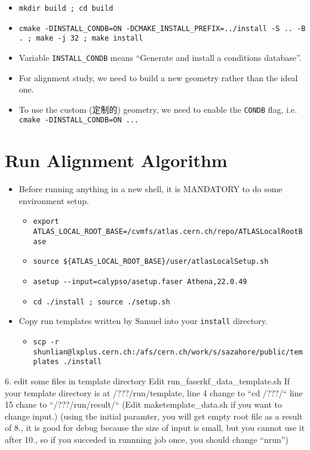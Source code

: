 \begin{itemize}
\begin{itemize}
		\item \verb|mkdir build ; cd build|
		\item \verb|cmake -DINSTALL_CONDB=ON -DCMAKE_INSTALL_PREFIX=../install -S .. -B . ; make -j 32 ; make install|
		\item Variable \verb|INSTALL_CONDB| means ``Generate and install a conditions database''.
		\item For alignment study, we need to build a new geometry rather than the ideal one.
		\item To use the custom (定制的) geometry, we need to enable the \verb|CONDB| flag, i.e. \verb|cmake -DINSTALL_CONDB=ON ...| 
	\end{itemize}
\end{itemize}


\section{Run Alignment Algorithm}
\begin{itemize}
	\item Before running anything in a new shell, it is MANDATORY to do some environment setup. 
	\begin{itemize}
		\item \verb|export ATLAS_LOCAL_ROOT_BASE=/cvmfs/atlas.cern.ch/repo/ATLASLocalRootBase|
		\item \verb|source ${ATLAS_LOCAL_ROOT_BASE}/user/atlasLocalSetup.sh|
		\item \verb|asetup --input=calypso/asetup.faser Athena,22.0.49|
		\item \verb|cd ./install ; source ./setup.sh|
	\end{itemize}
	\item Copy run templates written by Samuel into your \verb|install| directory.
	\begin{itemize}
		\item \verb|scp -r shunlian@lxplus.cern.ch:/afs/cern.ch/work/s/sazahore/public/templates ./install|
	\end{itemize}



\end{itemize}


6. edit some files in template directory
Edit run_faserkf_data_template.sh
If your template directory is at /???/run/template, 
line 4 change to “cd /???/“
line 15 chane to “/???/run/result/“
(Edit maketemplate_data.sh if you want to change input.)
(using the initial paramter, you will get empty root file as a result of 8., 
it is good for debug because the size of input is small, but
you cannot use it after 10., so if you succeded in runnning job once, you should change “nrun”)

